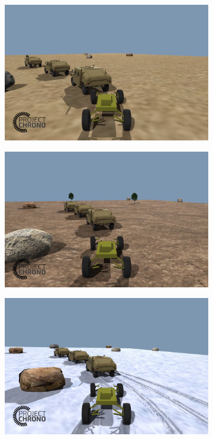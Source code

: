 \documentclass[12pt,twocolumn]{article}
\begin{document}
\begin{figure}
    \centering
    \begin{subfigure}{0.33\textwidth}
        \includegraphics[width=\linewidth]{Figs/Demonstration/rigid_1i_3f.png}
        \caption{} \label{fig:rigid13}
    \end{subfigure}%
    \begin{subfigure}{0.33\textwidth}
        \includegraphics[width=\linewidth]{Figs/Demonstration/hard_1i_3f.png}
        \caption{} \label{fig:hard13}
    \end{subfigure}%
    \begin{subfigure}{0.33\textwidth}
        \includegraphics[width=\linewidth]{Figs/Demonstration/soft_1i_3f.png}

\end{subfigure}
\end{figure}
\end{document}
